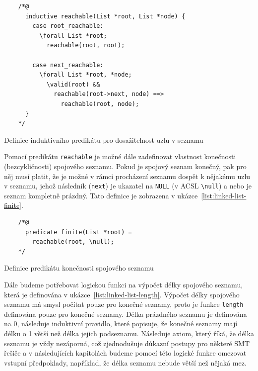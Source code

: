 \begin{listing}[H]
    \begin{verbatim}
    /*@
      inductive reachable(List *root, List *node) {
        case root_reachable:
          \forall List *root;
            reachable(root, root);

        case next_reachable:
          \forall List *root, *node;
            \valid(root) &&
              reachable(root->next, node) ==>
                reachable(root, node);
      }
    */
    \end{verbatim}
    \caption{Definice induktivního predikátu pro dosažitelnost uzlu v seznamu}
    \label{list:linked-list-reachabibility}
\end{listing}

Pomocí predikátu \texttt{reachable} je možné dále zadefinovat vlastnost konečnosti (bezcykličnosti) spojového seznamu.
Pokud je spojový seznam konečný, pak pro něj musí platit, že je možné v rámci procházení seznamu
dospět k nějakému uzlu v seznamu,
jehož následník (\texttt{next}) je ukazatel na \texttt{NULL} (v ACSL \texttt{\textbackslash null})
a nebo je seznam kompletně prázdný.
Tato definice je zobrazena v ukázce~\ref{list:linked-list-finite}.

\begin{listing}[H]
    \begin{verbatim}
    /*@
      predicate finite(List *root) =
        reachable(root, \null);
    */
    \end{verbatim}
    \caption{Definice predikátu konečnosti spojového seznamu}
    \label{list:linked-list-finite}
\end{listing}

Dále budeme potřebovat logickou funkci na výpočet délky spojového seznamu,
která je definována v ukázce~\ref{list:linked-list-length}.
Výpočet délky spojového seznamu má smysl počítat pouze pro konečné seznamy,
proto je funkce \texttt{length} definována pouze pro konečné seznamy.
Délka prázdného seznamu je definována na 0, následuje induktivní pravidlo,
které popisuje, že konečné seznamy mají délku o 1 větší než délka jejich podseznamu.
Následuje axiom, který říká, že délka seznamu je vždy nezáporná,
což zjednodušuje důkazní postupy pro některé SMT řešiče
a v následujících kapitolách budeme pomocí této logické funkce
omezovat vstupní předpoklady, například, že délka seznamu nebude větší než nějaká mez.


